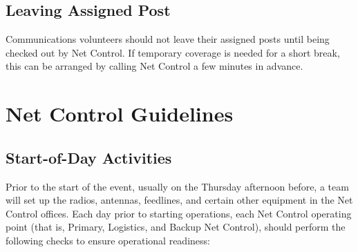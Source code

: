 \documentclass[pdflatex,letterpaper,twoside,12pt]{book}
\begin{document}

\section{Leaving Assigned Post}

Communications volunteers should not leave their assigned posts until being checked out by Net Control.  If temporary coverage is needed for a short break, this can be arranged by calling Net Control a few minutes in advance.


\chapter{Net Control Guidelines}

\section{Start-of-Day Activities}

Prior to the start of the event, usually on the Thursday afternoon before, a team will set up the radios, antennas, feedlines, and certain other equipment in the Net Control offices.  Each day prior to starting operations, each Net Control operating point (that is, Primary, Logistics, and Backup Net Control), should perform the following checks to ensure operational readiness:
\end{document}
